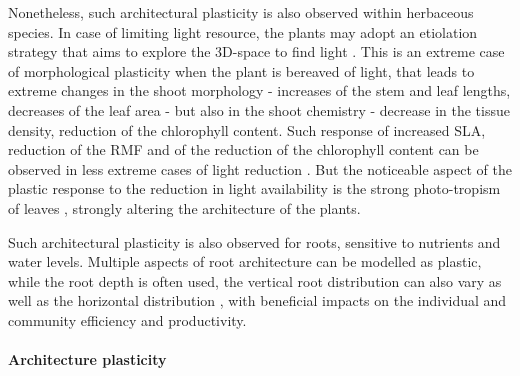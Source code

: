 Nonetheless, such architectural plasticity is also observed within herbaceous species. In case of limiting light resource, the plants may adopt an etiolation strategy that aims to explore the 3D-space to find light \parencite{whippo_phototropism:_2006}. This is an extreme case of morphological plasticity when the plant is bereaved of light, that leads to extreme changes in the shoot morphology - increases of the stem and leaf lengths, decreases of the leaf area - but also in the shoot chemistry - decrease in the tissue density, reduction of the chlorophyll content. Such response of increased SLA, reduction of the RMF and of the reduction of the chlorophyll content can be observed in less extreme cases of light reduction \parencite{mitchell_intraspecific_2014}. But the noticeable aspect of the plastic response to the reduction in light availability is the strong photo-tropism of leaves \parencite{whippo_phototropism:_2006}, strongly altering the architecture of the plants.

Such architectural plasticity is also observed for roots, sensitive to nutrients and water levels. Multiple aspects of root architecture can be modelled as plastic, while the root depth is often used, the vertical root distribution can also vary \parencite{nippert_challenging_2015} as well as the horizontal distribution \parencite{maire_plasticity_2013}, with beneficial impacts on the individual and community efficiency and productivity.


\paragraph{Architecture plasticity}

